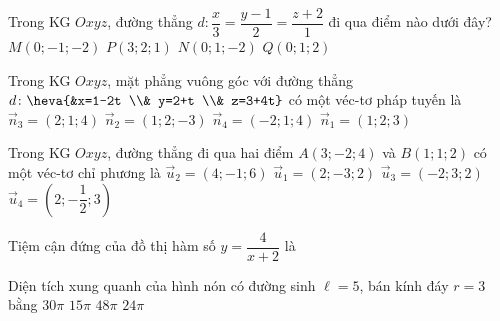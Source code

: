 \begin{ex}%
	Trong KG $Oxyz$, đường thẳng $d\colon \dfrac{x}{3}=\dfrac{y-1}{2}=\dfrac{z+2}{1}$ đi qua điểm nào dưới đây?
	\choice
	{$M(0 ;-1 ;-2)$}
	{$P(3 ; 2 ; 1)$}
	{\True $N(0 ; 1 ;-2)$}
	{$Q(0 ; 1 ; 2)$}
\end{ex}
\begin{ex}%
	Trong KG $Oxyz$, mặt phẳng vuông góc với đường thẳng $d\colon \heva{&x=1-2t \\& y=2+t \\& z=3+4t}$ có một véc-tơ pháp tuyến là
	\choice
	{$\overrightarrow{n}_3=(2;1;4)$}
	{$\overrightarrow{n}_2=(1;2;-3)$}
	{\True $\overrightarrow{n}_4=(-2;1;4)$}
	{$\overrightarrow{n}_1=(1;2;3)$}
\end{ex}
\begin{ex}%
	Trong KG $Oxyz$, đường thẳng đi qua hai điểm $A(3;-2;4)$ và $B(1;1;2)$ có một véc-tơ chỉ phương là
	\choice
	{$\overrightarrow{u}_2=(4;-1;6)$}
	{\True $\overrightarrow{u}_1=(2;-3;2)$}
	{$\overrightarrow{u}_3=(-2;3;2)$}
	{$\overrightarrow{u}_4=\left(2;-\dfrac{1}{2};3\right)$}
\end{ex}

\begin{ex}%
	Tiệm cận đứng của đồ thị hàm số $y=\dfrac{4}{x+2}$ là
\end{ex}

\begin{ex}%
	Diện tích xung quanh của hình nón có đường sinh $\ell=5$, bán kính đáy $r=3$ bằng
	\choice
	{$30 \pi$}
	{\True $15 \pi$}
	{$48 \pi$}
	{$24 \pi$}
\end{ex}

